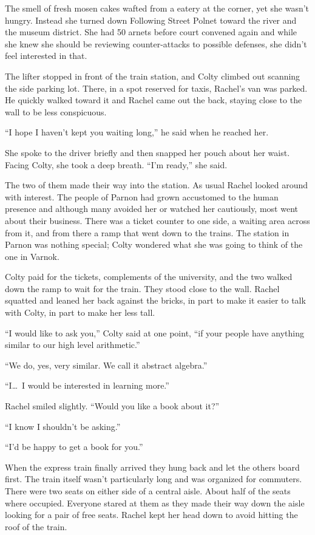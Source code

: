 The smell of fresh mosen cakes wafted from a eatery at the corner, yet she wasn't hungry.
Instead she turned down Following Street Polnet toward the river and the museum district. She
had 50 arnets before court convened again and while she knew she should be reviewing
counter-attacks to possible defenses, she didn't feel interested in that.

\spacebreak

The lifter stopped in front of the train station, and Colty climbed out scanning the side
parking lot. There, in a spot reserved for taxis, Rachel's van was parked. He quickly walked
toward it and Rachel came out the back, staying close to the wall to be less conspicuous.

``I hope I haven't kept you waiting long,'' he said when he reached her.

She spoke to the driver briefly and then snapped her pouch about her waist. Facing Colty, she
took a deep breath. ``I'm ready,'' she said.

The two of them made their way into the station. As usual Rachel looked around with interest.
The people of Parnon had grown accustomed to the human presence and although many avoided her or
watched her cautiously, most went about their business. There was a ticket counter to one side,
a waiting area across from it, and from there a ramp that went down to the trains. The station
in Parnon was nothing special; Colty wondered what she was going to think of the one in Varnok.

Colty paid for the tickets, complements of the university, and the two walked down the ramp to
wait for the train. They stood close to the wall. Rachel squatted and leaned her back against
the bricks, in part to make it easier to talk with Colty, in part to make her less tall.

``I would like to ask you,'' Colty said at one point, ``if your people have anything similar to
our high level arithmetic.''

``We do, yes, very similar. We call it abstract algebra.''

``I\ldots\ I would be interested in learning more.''

Rachel smiled slightly. ``Would you like a book about it?''

``I know I shouldn't be asking.''

``I'd be happy to get a book for you.''

When the express train finally arrived they hung back and let the others board first. The train
itself wasn't particularly long and was organized for commuters. There were two seats on either
side of a central aisle. About half of the seats where occupied. Everyone stared at them as they
made their way down the aisle looking for a pair of free seats. Rachel kept her head down to
avoid hitting the roof of the train.

